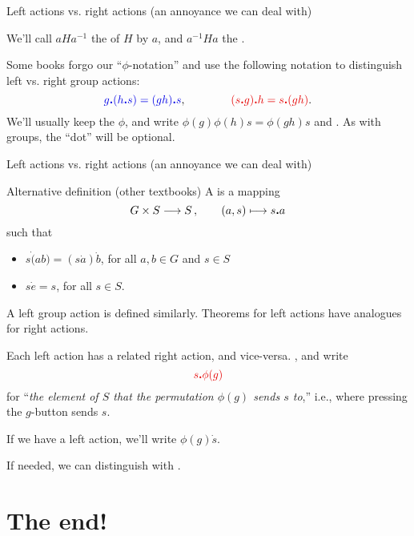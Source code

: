 \documentclass[8pt, handout]{beamer}
\newcommand{\Pause}{}      %
\begin{document}
\begin{frame}{Left actions vs. right actions (an annoyance we can deal with)}
  \Pause %

  We'll call $aHa^{-1}$ the  of $H$ by $a$, and
  $a^{-1}Ha$ the . \medskip\Pause
  
  Some books forgo our ``$\phi$-notation'' and use the following
  notation to distinguish left vs. right group actions:
  \[
    {\color{xBlue}g\Dot(h\Dot s)=(gh)\Dot s},
    \qquad\qquad\Alert{(s\Dot g)\Dot h=s\Dot(gh)}.
  \]
  \Pause We'll usually keep the $\phi$, and write
  {\color{xBlue}$\phi(g)\phi(h)s=\phi(gh)s$} and
  . As with groups, the ``dot''
  will be optional.
  
\end{frame}


\begin{frame}{Left actions vs. right actions (an annoyance we can deal with)} 

  \begin{block}{Alternative definition (other textbooks)}
    A  is a mapping
    \[
    G\times S\longrightarrow S\,,\qquad (a,s)\longmapsto s\bm{.} a
    \]
    \Pause such that 
    \begin{itemize}
    \item $s\Dot(ab)=(s\Dot a)\Dot b$,\; for all $a,b\in G$ and $s\in S$ \Pause
    \item $s\Dot e=s$,\; for all $s\in S$.
    \end{itemize}
  \end{block}

  \medskip\Pause 
  
  A {\color{xBlue}left group action} is defined similarly. Theorems
  for left actions have analogues for right actions.

  \Pause\medskip

  Each left action has a related right action, and vice-versa. \Pause
  , and write
  \[
  \Alert{s\Dot\phi(g)}
  \]
  for ``\emph{the element of $S$ that the permutation $\phi(g)$ sends $s$
  to},'' i.e., where pressing the $g$-button sends $s$.
 
  \Pause\medskip

  If we have a left action, we'll write {\color{xBlue}$\phi(g)\Dot s$}. 

  \Pause\medskip

  If needed, we can distinguish  with
  .


\end{frame}%

\section*{The end!}
\end{document}
